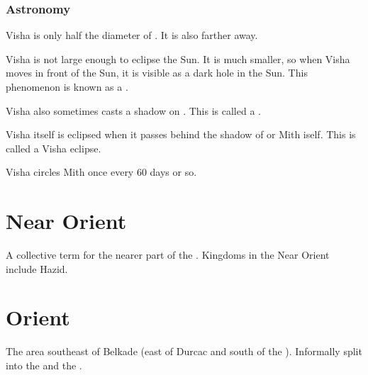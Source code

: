 \subsubsection{Astronomy}
Visha is only half the diameter of \Dun{}. 
It is also farther away. 

Visha is not large enough to eclipse the Sun. It is much smaller, so when Visha moves in front of the Sun, it is visible as a dark hole in the Sun. This phenomenon is known as a . 

Visha also sometimes casts a shadow on \Dun{}. This is called a . 

Visha itself is eclipsed when it passes behind the shadow of \Dun{} or Mith iself. This is called a Visha eclipse. 

Visha circles Mith once every 60 days or so.
















\section{Near Orient}
\label{Near Orient}
A collective term for the nearer part of the . 
Kingdoms in the Near Orient include Hazid. 















\section{Orient}
\label{Orient}
The area southeast of Belkade (east of Durcac and south of the \Serplands{}). 
Informally split into the  and the . 

















